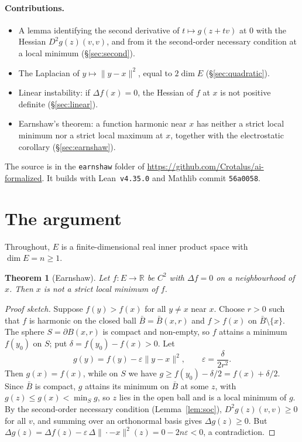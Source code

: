 \documentclass[11pt]{article}
\newtheorem{theorem}{Theorem}
\theoremstyle{remark}
\begin{document}
\paragraph{Contributions.}
\begin{itemize}
  \item A lemma identifying the second derivative of $t\mapsto g(z+tv)$ at $0$ with the Hessian
  $D^2g(z)(v,v)$, and from it the second-order necessary condition at a local minimum
  (\S\ref{sec:second}).
  \item The Laplacian of $y\mapsto\|y-x\|^2$, equal to $2\dim E$ (\S\ref{sec:quadratic}).
  \item Linear instability: if $\Delta f(x)=0$, the Hessian of $f$ at $x$ is not positive definite
  (\S\ref{sec:linear}).
  \item Earnshaw's theorem: a function harmonic near $x$ has neither a strict local minimum nor a
  strict local maximum at $x$, together with the electrostatic corollary (\S\ref{sec:earnshaw}).
\end{itemize}

The source is in the \texttt{earnshaw} folder of
\url{https://github.com/Crotalus/ai-formalized}. It builds with Lean~\texttt{v4.35.0} and
Mathlib commit \texttt{56a0058}.

\section{The argument}

Throughout, $E$ is a finite-dimensional real inner product space with $\dim E=n\ge1$.

\begin{theorem}[Earnshaw]\label{thm:earnshaw}
Let $f\colon E\to\mathbb{R}$ be $C^2$ with $\Delta f=0$ on a neighbourhood of $x$. Then $x$ is
not a strict local minimum of $f$.
\end{theorem}

\begin{proof}[Proof sketch]
Suppose $f(y)>f(x)$ for all $y\ne x$ near $x$. Choose $r>0$ such that $f$ is harmonic on the closed
ball $\bar B=\bar B(x,r)$ and $f>f(x)$ on $\bar B\setminus\{x\}$. The sphere $S=\partial B(x,r)$
is compact and non-empty, so $f$ attains a minimum $f(y_0)$ on $S$; put $\delta=f(y_0)-f(x)>0$.
Let
\[
  g(y)=f(y)-\varepsilon\|y-x\|^2,\qquad \varepsilon=\frac{\delta}{2r^2}.
\]
Then $g(x)=f(x)$, while on $S$ we have $g\ge f(y_0)-\delta/2=f(x)+\delta/2$. Since $\bar B$ is
compact, $g$ attains its minimum on $\bar B$ at some $z$, with $g(z)\le g(x)<\min_S g$, so $z$ lies
in the open ball and is a local minimum of $g$. By the second-order necessary condition
(Lemma~\ref{lem:soc}), $D^2g(z)(v,v)\ge0$ for all $v$, and summing over an orthonormal basis gives
$\Delta g(z)\ge0$. But
$\Delta g(z)=\Delta f(z)-\varepsilon\,\Delta\|\cdot-x\|^2(z)=0-2n\varepsilon<0$, a contradiction.
\end{proof}
\end{document}
